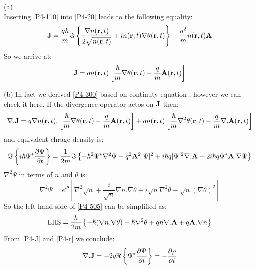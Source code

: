 \begin{homeworkProblem}
\begin{homeworkSection}{(a)}
\begin{equation}
\end{equation}
Inserting \eqref{P4-110} into \eqref{P4-20} leads to the following equality:
\begin{equation}
\mathbf{J}=\frac{q\hbar}{m}\Im\left\{\frac{\nabla n(\mathbf{r},t)}{2\sqrt{n(\mathbf{r},t)}}+in(\mathbf{r},t)\nabla\theta(\mathbf{r},t)\right\}-\frac{q^2}{m}n(\mathbf{r},t)\mathbf{A}
\end{equation}
So we arrive at:
\begin{equation}\label{P4-300}
\mathbf{J}=qn(\mathbf{r},t)\left[\frac{\hbar}{m}\nabla\theta(\mathbf{r},t)-\frac{q}{m}\mathbf{A}(\mathbf{r},t)\right]
\end{equation}
\end{homeworkSection}
\begin{homeworkSection}{(b)}
In fact  we derived  \eqref{P4-300} based on continuty equation , however we can check it here.  If the divergence operator actos on $\mathbf{J}$ then:
\begin{equation}\label{P4-J}
\nabla.\mathbf{J}=q\nabla n(\mathbf{r},t).\left[\frac{\hbar}{m}\nabla\theta(\mathbf{r},t)-\frac{q}{m}\mathbf{A}(\mathbf{r},t)\right]+
q n(\mathbf{r},t)\left[\frac{\hbar}{m}\nabla^2\theta(\mathbf{r},t)-\frac{q}{m}\nabla.\mathbf{A}(\mathbf{r},t)\right]
\end{equation}  
and equivalent chrage density is:
\begin{equation}\label{P4-505}
\Im\left\{i\hbar\Psi^*\dfrac{\partial \Psi}{\partial t}\right\}=
\frac{1}{2m}\Im\left\{-\hbar^2\Psi^*\nabla^2\Psi+q^2 \mathbf{A}^2\lvert\Psi\rvert^2+i\hbar q\lvert\Psi\rvert^2\nabla.\mathbf{A}+2i\hbar q\Psi^*\mathbf{A}.\nabla\Psi\right\}
\end{equation}
$\nabla^2 \Psi$ in terms of $n$ and $\theta$ is:
\begin{equation}
\nabla^2\Psi=e^{i\theta}\left[\nabla^2 \sqrt{n}+\frac{i}{\sqrt{n}}\nabla n.\nabla\theta+i\sqrt{n}\nabla^2\theta-\sqrt{n}(\nabla\theta)^2\right]
\end{equation}
So the left hand side of \eqref{P4-505} can be simplified as:
\begin{equation}\label{P4-r}
\text{LHS}=\frac{\hbar}{2m}\left\{-\hbar(\nabla n.\nabla\theta)+\hbar\nabla^2\theta+q n\nabla.\mathbf{A}+ q \mathbf{A}.\nabla n\right\}
\end{equation}
From \eqref{P4-J} and \eqref{P4-r} we conclude:
\begin{equation}
\nabla.\mathbf{J}=-2q\Re\left\{\Psi^*\dfrac{\partial \Psi}{\partial t}\right\}=-\dfrac{\partial \rho}{\partial t}
\end{equation}
\end{homeworkSection}

\end{homeworkProblem}
